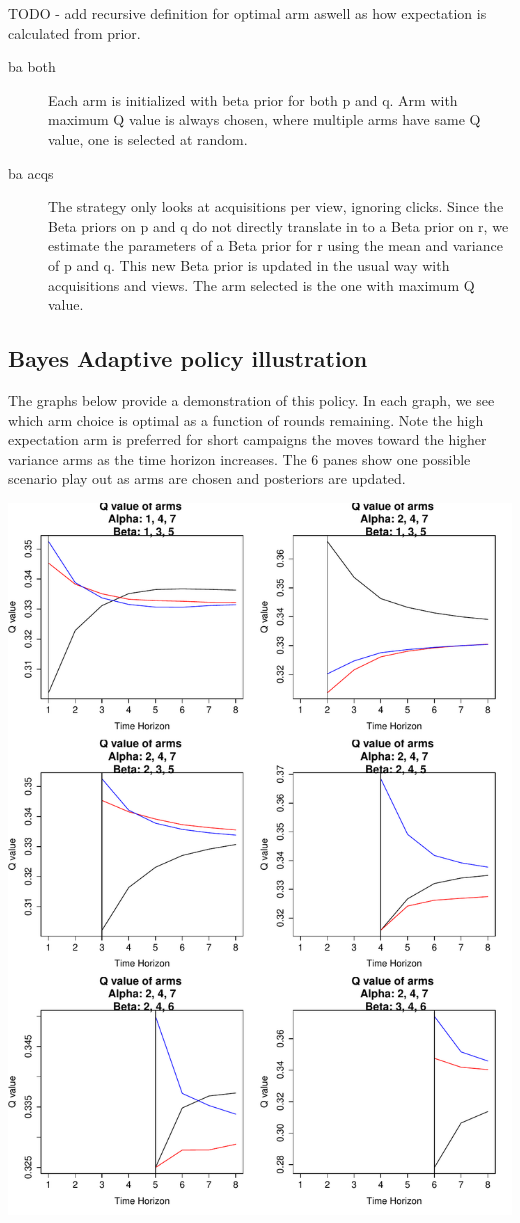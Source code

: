 \documentclass[12pt]{article}
\begin{document}
TODO - add recursive definition for optimal arm aswell as how expectation is calculated from prior.

\begin{description}
	\item[ba both] Each arm is initialized with beta prior for both p and q. Arm with maximum Q value is always chosen, where multiple arms have same Q value, one is selected at random.
	\item[ba acqs] The strategy only looks at acquisitions per view, ignoring clicks. Since the Beta priors on p and q do not directly translate in to a Beta prior on r, we estimate the parameters of a Beta prior for r using the mean and variance of p and q. This new Beta prior is updated in the usual way with acquisitions and views. The arm selected is the one with maximum Q value.
\end{description}


\subsection{Bayes Adaptive policy illustration}

The graphs below provide a demonstration of this policy. In each graph, we see which arm choice is optimal as a function of rounds remaining. Note the high expectation arm is preferred for short campaigns the moves toward the higher variance arms as the time horizon increases. The 6 panes show one possible scenario play out as arms are chosen and posteriors are updated.

\includegraphics[scale=0.7]{BARLillustration.pdf}
\end{document}
